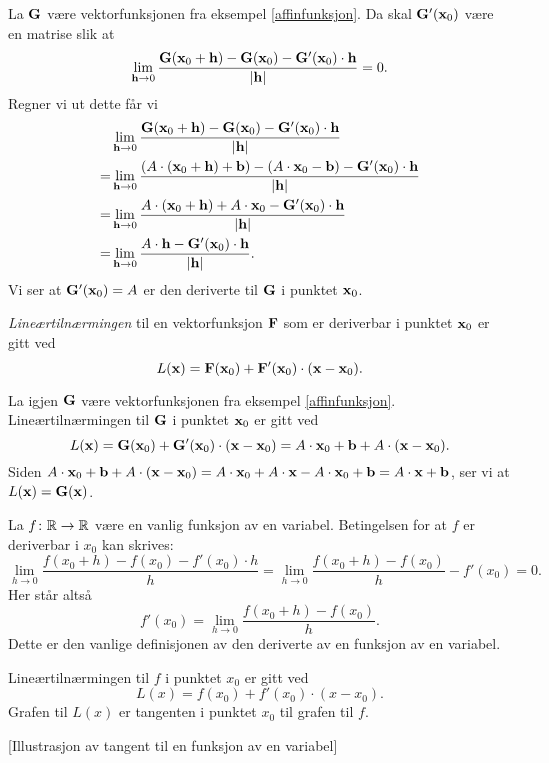 \begin{eksempel}
  La $\mathbf{G}$ være vektorfunksjonen fra eksempel \ref{affinfunksjon}. Da skal $\mathbf{G}'(\mathbf{x}_0)$ være en matrise slik at 
  $$\lim_{\mathbf{h}\to 0} \frac{\mathbf{G}(\mathbf{x}_0+\mathbf{h}) - \mathbf{G}(\mathbf{x}_0) -
  \mathbf{G}'(\mathbf{x}_0) \cdot \mathbf{h}}{|\mathbf{h}|} = 0.$$
  Regner vi ut dette får vi
  \begin{align*}
    &
    \lim_{\mathbf{h}\to 0} \frac{\mathbf{G}(\mathbf{x}_0+\mathbf{h}) -
    \mathbf{G}(\mathbf{x}_0) -
    \mathbf{G}'(\mathbf{x}_0) \cdot \mathbf{h}}{|\mathbf{h}|} \\
    =
    &
    \lim_{\mathbf{h}\to 0} \frac{\left(A \cdot (\mathbf{x}_0+\mathbf{h})  +
    \mathbf{b}\right) - \left(A \cdot \mathbf{x}_0  - \mathbf{b}\right) -
    \mathbf{G}'(\mathbf{x}_0) \cdot \mathbf{h}}{|\mathbf{h}|}\\
    =
    &
    \lim_{\mathbf{h}\to 0} \frac{A \cdot (\mathbf{x}_0+\mathbf{h})  +
    A \cdot \mathbf{x}_0  - 
    \mathbf{G}'(\mathbf{x}_0) \cdot \mathbf{h}}{|\mathbf{h}|} \\
    =
    &
    \lim_{\mathbf{h}\to 0} \frac{A \cdot \mathbf{h}  - 
    \mathbf{G}'(\mathbf{x}_0) \cdot \mathbf{h}}{|\mathbf{h}|}.
  \end{align*}
  Vi ser at $\mathbf{G}'(\mathbf{x}_0) = A$ er den deriverte til $\mathbf{G}$ i punktet $\mathbf{x}_0$.
\end{eksempel}

\begin{definisjon}
  {\em Lineærtilnærmingen} til en vektorfunksjon $\mathbf{F}$ som er deriverbar i punktet $\mathbf{x}_0$ er
  gitt ved
  $$L(\mathbf{x}) = \mathbf{F}(\mathbf{x}_0) + \mathbf{F}'(\mathbf{x}_0) \cdot (\mathbf{x} - \mathbf{x}_0).$$
\end{definisjon}

\begin{eksempel}
  La igjen $\mathbf{G}$ være vektorfunksjonen fra eksempel \ref{affinfunksjon}. Lineærtilnærmingen til $\mathbf{G}$ i punktet $\mathbf{x}_0$ er gitt ved
  $$L(\mathbf{x}) = \mathbf{G}(\mathbf{x}_0) + \mathbf{G}'(\mathbf{x}_0) \cdot (\mathbf{x} - \mathbf{x}_0) = A \cdot \mathbf{x}_0 + \mathbf{b} + A \cdot (\mathbf{x} - \mathbf{x}_0).$$
  Siden $A \cdot \mathbf{x}_0 + \mathbf{b} + A \cdot (\mathbf{x} - \mathbf{x}_0) = A \cdot \mathbf{x}_0 + A
  \cdot \mathbf{x} - A \cdot \mathbf{x}_0 + \mathbf{b} = A \cdot \mathbf{x} + \mathbf{b}$, ser vi at
  $L(\mathbf{x}) = \mathbf{G}(\mathbf{x})$.
\end{eksempel}

\begin{eksempel}
  La $f \colon \mathbb{R} \to \mathbb{R}$ være en vanlig funksjon av en variabel. Betingelsen
  for at $f$ er deriverbar i $x_0$ kan skrives:
  $$\lim_{h\to 0} \frac{f(x_0+h) - f(x_0) - f'(x_0) \cdot h}{h} =
  \lim_{h\to 0} \frac{f(x_0+h) - f(x_0)}{h} - f'(x_0) = 0.$$
  Her står altså 
  $$f'(x_0) = \lim_{h\to 0} \frac{f(x_0+h) - f(x_0)}{h}.$$
  Dette er den vanlige definisjonen av den deriverte av en funksjon av en variabel.

  Lineærtilnærmingen til $f$ i punktet $x_0$ er gitt ved
  $$L(x) = f(x_0) + f'(x_0) \cdot (x - x_0).$$
  Grafen til $L(x)$ er tangenten i punktet $x_0$ til grafen til $f$.
\end{eksempel}
[Illustrasjon av tangent til en funksjon av en variabel]

